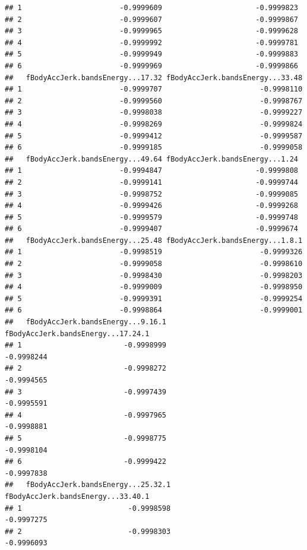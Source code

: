 \documentclass[
]{article}
\begin{document}
\begin{verbatim}
## 1                       -0.9999609                      -0.9999823
## 2                       -0.9999607                      -0.9999867
## 3                       -0.9999965                      -0.9999628
## 4                       -0.9999992                      -0.9999781
## 5                       -0.9999949                      -0.9999883
## 6                       -0.9999969                      -0.9999866
##   fBodyAccJerk.bandsEnergy...17.32 fBodyAccJerk.bandsEnergy...33.48
## 1                       -0.9999707                       -0.9998110
## 2                       -0.9999560                       -0.9998767
## 3                       -0.9998038                       -0.9999227
## 4                       -0.9998269                       -0.9999824
## 5                       -0.9999412                       -0.9999587
## 6                       -0.9999185                       -0.9999058
##   fBodyAccJerk.bandsEnergy...49.64 fBodyAccJerk.bandsEnergy...1.24
## 1                       -0.9994847                      -0.9999808
## 2                       -0.9999141                      -0.9999744
## 3                       -0.9998752                      -0.9999085
## 4                       -0.9999426                      -0.9999268
## 5                       -0.9999579                      -0.9999748
## 6                       -0.9999407                      -0.9999674
##   fBodyAccJerk.bandsEnergy...25.48 fBodyAccJerk.bandsEnergy...1.8.1
## 1                       -0.9998519                       -0.9999326
## 2                       -0.9999058                       -0.9998610
## 3                       -0.9998430                       -0.9998203
## 4                       -0.9999009                       -0.9998950
## 5                       -0.9999391                       -0.9999254
## 6                       -0.9998864                       -0.9999001
##   fBodyAccJerk.bandsEnergy...9.16.1 fBodyAccJerk.bandsEnergy...17.24.1
## 1                        -0.9998999                         -0.9998244
## 2                        -0.9998272                         -0.9994565
## 3                        -0.9997439                         -0.9995591
## 4                        -0.9997965                         -0.9998881
## 5                        -0.9998775                         -0.9998104
## 6                        -0.9999422                         -0.9997838
##   fBodyAccJerk.bandsEnergy...25.32.1 fBodyAccJerk.bandsEnergy...33.40.1
## 1                         -0.9998598                         -0.9997275
## 2                         -0.9998303                         -0.9996093

\end{verbatim}
\end{document}
